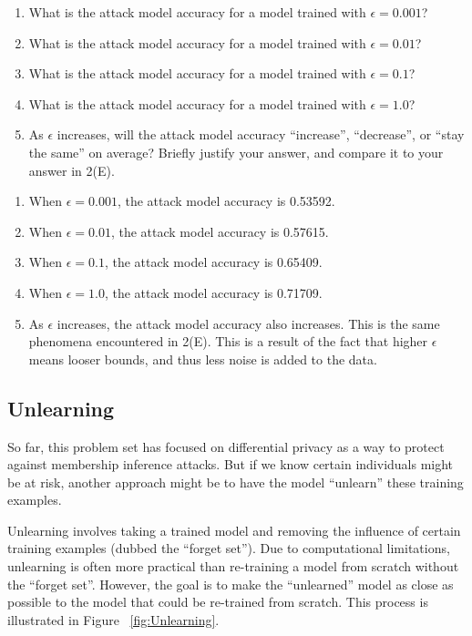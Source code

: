\documentclass{article}
\begin{document}
\begin{enumerate}[label=\Alph*.]
    \item What is the attack model accuracy for a model trained with $\epsilon=0.001$?
    \item What is the attack model accuracy for a model trained with $\epsilon=0.01$?
    \item What is the attack model accuracy for a model trained with $\epsilon=0.1$?
    \item What is the attack model accuracy for a model trained with $\epsilon=1.0$?
    \item As $\epsilon$ increases, will the attack model accuracy ``increase'', ``decrease'', or ``stay the same'' on average? Briefly justify your answer, and compare it to your answer in 2(E).
\end{enumerate}

\bigskip
\begin{mdframed}
\begin{enumerate}[label=\Alph*.]
    \item When $\epsilon = 0.001$, the attack model accuracy is 0.53592.
    \item When $\epsilon = 0.01$, the attack model accuracy is 0.57615.
    \item When $\epsilon = 0.1$, the attack model accuracy is 0.65409.
    \item When $\epsilon = 1.0$, the attack model accuracy is 0.71709.
    \item As $\epsilon$ increases, the attack model accuracy also increases. This is the same phenomena encountered in 2(E). This is a result of the fact that higher $\epsilon$ means looser bounds, and thus less noise is added to the data.
\end{enumerate}
\end{mdframed}

\subsection*{Unlearning}

So far, this problem set has focused on differential privacy as a way to protect against membership inference attacks. But if we know certain individuals might be at risk, another approach might be to have the model ``unlearn'' these training examples. 

Unlearning involves taking a trained model and removing the influence of certain training examples (dubbed the ``forget set''). Due to computational limitations, unlearning is often more practical than re-training a model from scratch without the ``forget set''. However, the goal is to make the ``unlearned'' model as close as possible to the model that could be re-trained from scratch. This process is illustrated in Figure ~\ref{fig:Unlearning}. 
\end{document}
